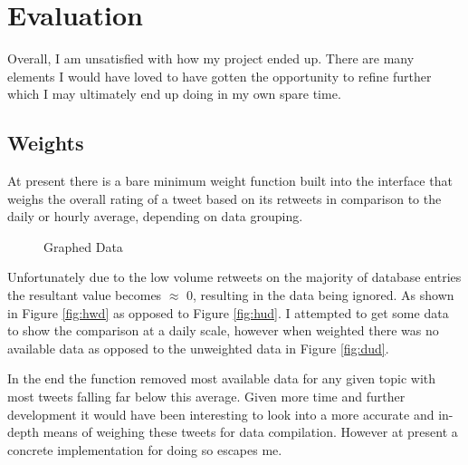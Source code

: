 \documentclass[12pt,a4paper]{report}
\begin{document}
\chapter{Evaluation}
\label{eval}
  Overall, I am unsatisfied with how my project ended up. There are many elements I would have loved to have gotten the opportunity to refine further which I may ultimately end up doing in my own spare time.
  \section{Weights}
  At present there is a bare minimum weight function built into the interface that weighs the overall rating of a tweet based on its retweets in comparison to the daily or hourly average, depending on data grouping.
  \par
  \begin{figure}[h]
    \centering
    \caption{Graphed Data}
    \label{fig:gd}
  \end{figure}
  Unfortunately due to the low volume retweets on the majority of database entries the resultant value becomes $\approx$ 0, resulting in the data being ignored. As shown in Figure \ref{fig:hwd} as opposed to Figure \ref{fig:hud}. I attempted to get some data to show the comparison at a daily scale, however when weighted there was no available data as opposed to the unweighted data in Figure \ref{fig:dud}.
  \par
  In the end the function removed most available data for any given topic with most tweets falling far below this average. Given more time and further development it would have been interesting to look into a more accurate and in-depth means of weighing these tweets for data compilation. However at present a concrete implementation for doing so escapes me.
\end{document}

